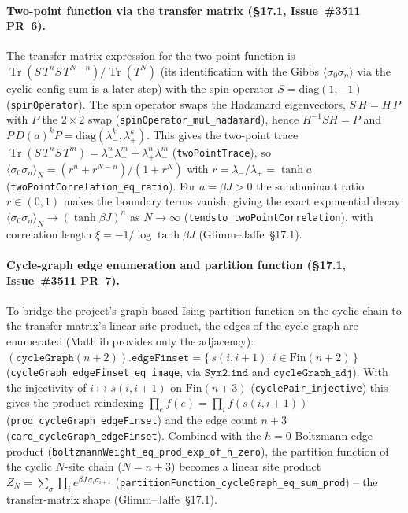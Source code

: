 \documentclass[a4paper,11pt]{article}
\begin{document}
\paragraph{Two-point function via the transfer matrix (\S17.1, Issue~\#3511 PR~6).}
The transfer-matrix expression for the two-point function is
$\operatorname{Tr}(S\,T^n S\,T^{N-n})/\operatorname{Tr}(T^N)$ (its identification with the
Gibbs $\langle\sigma_0\sigma_n\rangle$ via the cyclic config sum is a later step)
with the spin operator $S = \mathrm{diag}(1,-1)$ (\texttt{spinOperator}). The spin
operator swaps the Hadamard eigenvectors, $S\,H = H\,P$ with $P$ the $2\times2$
swap (\texttt{spinOperator\_mul\_hadamard}), hence $H^{-1}SH = P$ and
$P\,D(a)^k P = \mathrm{diag}(\lambda_-^k, \lambda_+^k)$. This gives the two-point
trace $\operatorname{Tr}(S\,T^n S\,T^m) = \lambda_-^n\lambda_+^m + \lambda_+^n\lambda_-^m$
(\texttt{twoPointTrace}), so
$\langle\sigma_0\sigma_n\rangle_N = (r^n + r^{N-n})/(1 + r^N)$ with $r = \lambda_-/\lambda_+ = \tanh a$
(\texttt{twoPointCorrelation\_eq\_ratio}). For $a = \beta J > 0$ the subdominant
ratio $r \in (0,1)$ makes the boundary terms vanish, giving the exact exponential
decay $\langle\sigma_0\sigma_n\rangle_N \to (\tanh\beta J)^n$ as $N\to\infty$
(\texttt{tendsto\_twoPointCorrelation}), with correlation length
$\xi = -1/\log\tanh\beta J$ (Glimm--Jaffe~\S17.1).

\paragraph{Cycle-graph edge enumeration and partition function (\S17.1, Issue~\#3511 PR~7).}
To bridge the project's graph-based Ising partition function on the cyclic chain
to the transfer-matrix's linear site product, the edges of the cycle graph are
enumerated (Mathlib provides only the adjacency):
$(\texttt{cycleGraph}(n{+}2)).\texttt{edgeFinset} = \{\,s(i, i{+}1) : i \in \mathrm{Fin}(n{+}2)\,\}$
(\texttt{cycleGraph\_edgeFinset\_eq\_image}, via $\texttt{Sym2.ind}$ and
$\texttt{cycleGraph\_adj}$). With the injectivity of $i \mapsto s(i, i{+}1)$ on
$\mathrm{Fin}(n{+}3)$ (\texttt{cyclePair\_injective}) this gives the product
reindexing $\prod_{e} f(e) = \prod_{i} f(s(i,i{+}1))$
(\texttt{prod\_cycleGraph\_edgeFinset}) and the edge count $n{+}3$
(\texttt{card\_cycleGraph\_edgeFinset}). Combined with the $h=0$ Boltzmann edge
product (\texttt{boltzmannWeight\_eq\_prod\_exp\_of\_h\_zero}), the partition
function of the cyclic $N$-site chain ($N = n{+}3$) becomes a linear site product
$Z_N = \sum_\sigma \prod_{i} e^{\beta J\,\sigma_i\sigma_{i+1}}$
(\texttt{partitionFunction\_cycleGraph\_eq\_sum\_prod}) -- the transfer-matrix
shape (Glimm--Jaffe~\S17.1).
\end{document}
